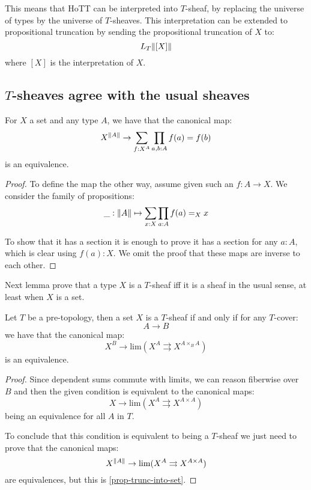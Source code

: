 This means that HoTT can be interpreted into $T$-sheaf, by replacing the universe of types by the universe of $T$-sheaves. This interpretation can be extended to propositional truncation by sending the propositional truncation of $X$ to:
\[L_T\lVert [X] \rVert\]
where $[X]$ is the interpretation of $X$.

\subsection{$T$-sheaves agree with the usual sheaves}

\begin{lemma}\label{prop-trunc-into-set}
For $X$ a set and any type $A$, we have that the canonical map:
\[X^{\lVert A \rVert} \to \sum_{f:X^A} \prod_{a,b:A} f(a)=f(b)\]
is an equivalence.
\end{lemma}

\begin{proof}
To define the map the other way, assume given such an $f:A\to X$. We consider the family of propositions:
\[ \_:\lVert A \rVert \mapsto \sum_{x:X} \prod_{a:A} f(a)=_X x\]

To show that it has a section it is enough to prove it has a section for any $a:A$, which is clear using $f(a):X$. We omit the proof that these maps are inverse to each other.
\end{proof}

Next lemma prove that a type $X$ is a $T$-sheaf iff it is a sheaf in the usual sense, at least when $X$ is a set.

\begin{lemma}\label{set-sheaves-condition}
Let $T$ be a pre-topology, then a set $X$ is a $T$-sheaf if and only if for any $T$-cover:
\[A\to B\]
we have that the canonical map: 
\[X^B\to \mathrm{lim} (X^A \rightrightarrows X^{A\times_BA})\]
is an equivalence.
\end{lemma}

\begin{proof}
Since dependent sums commute with limits, we can reason fiberwise over $B$ and then the given condition is equivalent to the canonical maps:
\[X\to \mathrm{lim} (X^A \rightrightarrows X^{A\times A})\]
being an equivalence for all $A$ in $T$. 

To conclude that this condition is equivalent to being a $T$-sheaf we just need to prove that the canonical maps:
\[X^{\lVert A \rVert} \to \mathrm{lim} (X^A \rightrightarrows X^{A\times A})\]
are equivalences, but this is \cref{prop-trunc-into-set}.
\end{proof}

